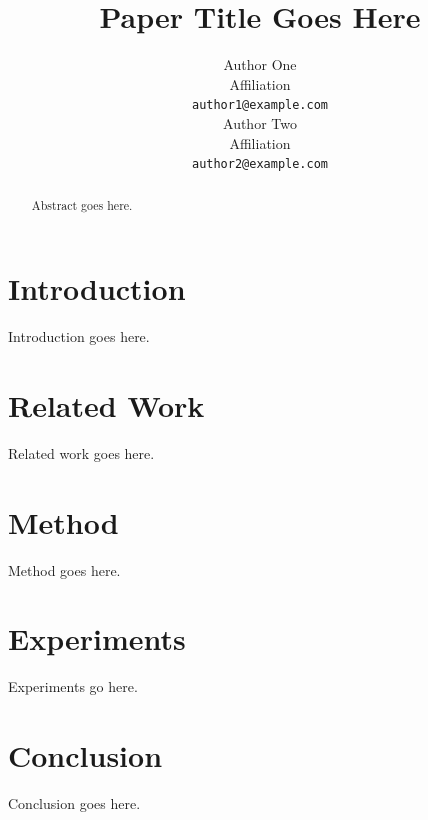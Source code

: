 \documentclass[10pt,twocolumn]{article}
\title{Paper Title Goes Here}
\author{
  Author One \\
  Affiliation \\
  \texttt{author1@example.com} \\
  \And
  Author Two \\
  Affiliation \\
  \texttt{author2@example.com}
}
\begin{document}
\maketitle

\begin{abstract}
Abstract goes here.
\end{abstract}

\section{Introduction}
Introduction goes here.

\section{Related Work}
Related work goes here.

\section{Method}
Method goes here.

\section{Experiments}
Experiments go here.

\section{Conclusion}
Conclusion goes here.



\end{document}
